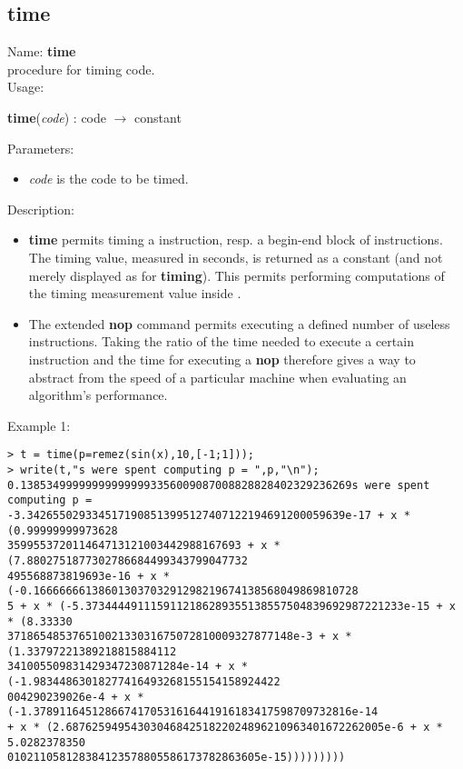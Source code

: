 \subsection{time}
\label{labtime}
\noindent Name: \textbf{time}\\
procedure for timing \sollya code.\\
\noindent Usage: 
\begin{center}
\textbf{time}(\emph{code}) : \textsf{code} $\rightarrow$ \textsf{constant}\\
\end{center}
Parameters: 
\begin{itemize}
\item \emph{code} is the code to be timed.
\end{itemize}
\noindent Description: \begin{itemize}

\item \textbf{time} permits timing a \sollya instruction, resp. a begin-end block
   of \sollya instructions. The timing value, measured in seconds, is returned
   as a \sollya constant (and not merely displayed as for \textbf{timing}). This 
   permits performing computations of the timing measurement value inside \sollya.

\item The extended \textbf{nop} command permits executing a defined number of
   useless instructions. Taking the ratio of the time needed to execute a
   certain \sollya instruction and the time for executing a \textbf{nop}
   therefore gives a way to abstract from the speed of a particular 
   machine when evaluating an algorithm's performance.
\end{itemize}
\noindent Example 1: 
\begin{center}\begin{minipage}{15cm}\begin{Verbatim}[frame=single]
> t = time(p=remez(sin(x),10,[-1;1]));
> write(t,"s were spent computing p = ",p,"\n");
0.138534999999999999993356009087008828828402329236269s were spent computing p = 
-3.3426550293345171908513995127407122194691200059639e-17 + x * (0.99999999973628
359955372011464713121003442988167693 + x * (7.8802751877302786684499343799047732
495568873819693e-16 + x * (-0.16666666138601303703291298219674138568049869810728
5 + x * (-5.3734444911159112186289355138557504839692987221233e-15 + x * (8.33330
37186548537651002133031675072810009327877148e-3 + x * (1.33797221389218815884112
341005509831429347230871284e-14 + x * (-1.98344863018277416493268155154158924422
004290239026e-4 + x * (-1.3789116451286674170531616441916183417598709732816e-14 
+ x * (2.6876259495430304684251822024896210963401672262005e-6 + x * 5.0282378350
010211058128384123578805586173782863605e-15)))))))))
\end{Verbatim}
\end{minipage}\end{center}
